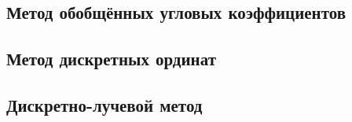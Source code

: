 \subsection{Метод обобщённых угловых коэффициентов}

\subsection{Метод дискретных ординат}

\subsection{Дискретно-лучевой метод}

\def\wA{5mm}
\def\wB{27mm}
\def\wC{23mm}
\def\wD{23mm}
\def\wE{23mm}
\def\wF{23mm}
\def\wG{23mm}
\def\wH{23mm}
\def\wI{22mm}
\def\wJ{22mm}
